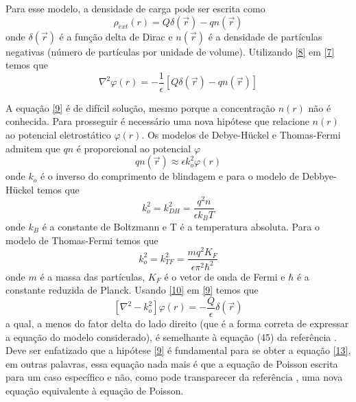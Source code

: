 \documentclass[brazilian,10.7pt,a4paper]{article}
\begin{document}
\begin{multicols}{2}
\par Para esse modelo, a densidade de carga pode ser escrita como
\\
\begin{equation}\label{8}
\rho_{ext}(r)=Q\delta(\vec{r})-qn(\vec{r})
\end{equation}
onde $\delta(\vec{r})$ é a função delta de Dirac e $n(\vec{r})$ é a densidade de partículas negativas (número de partículas por unidade de volume). Utilizando \eqref{8} em \eqref{7} temos que
\\
\begin{equation}\label{9}
\nabla^{2}\varphi(r)=-\frac{1}{\epsilon}[Q\delta(\vec{r})-qn(\vec{r})]
\end{equation}
\par A equação \eqref{9} é de difícil solução, mesmo porque a concentração $n(r)$ não é conhecida. Para prosseguir é necessário uma nova hipótese que relacione $n(r)$ ao potencial eletrostático $\varphi(r)$. Os modelos de Debye-Hückel e Thomas-Fermi admitem que $qn$ é proporcional ao potencial $\varphi$
\\
\begin{equation}\label{10}
qn(\vec{r})\approx \epsilon k^{2}_{o}\varphi(r)
\end{equation}
onde $k_{o}$ é o inverso do comprimento de blindagem e para o modelo de Debbye-Hückel temos que
\\
\begin{equation}\label{11}
k^{2}_{o}=k^{2}_{DH}=\frac{q^{2}n}{\epsilon k_{B}T}
\end{equation}
onde $k_{B}$ é a constante de Boltzmann e T é a temperatura absoluta. Para o modelo de Thomas-Fermi temos que
\\
\begin{equation}\label{12}
k^{2}_{o}=k^{2}_{TF}=\frac{mq^{2}K_{F}}{\epsilon\pi^{2}\hbar^{2}}
\end{equation}
onde $m$ é a massa das partículas, $K_{F}$ é o vetor de onda de Fermi e $\hbar$ é a constante reduzida de Planck. Usando \eqref{10} em \eqref{9} temos que
\\
\begin{equation}\label{13}
[\nabla^{2}-k^{2}_{o}]\varphi(r)=-\frac{Q}{\epsilon}\delta(\vec{r})
\end{equation}
a qual, a menos do fator delta do lado direito (que é a forma correta de expressar a equação do modelo considerado), é semelhante à equação (45) da referência \cite{ramos}. Deve ser enfatizado que a hipótese \eqref{9} é fundamental para se obter a equação \eqref{13}, em outras palavras, essa equação nada mais é que a equação de Poisson escrita para um caso específico e não, como pode transparecer da referência \cite{ramos}, uma nova equação equivalente à equação de Poisson.

\end{multicols}
\end{document}
